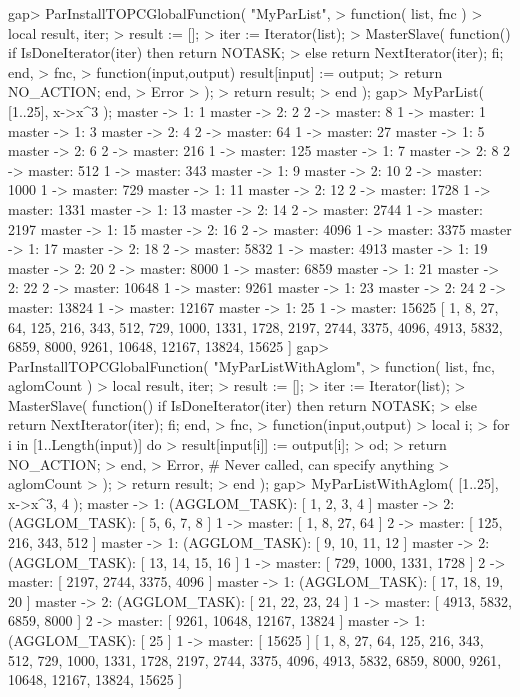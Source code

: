 \beginexample
gap> ParInstallTOPCGlobalFunction( "MyParList",
> function( list, fnc )
>   local result, iter;
>   result := [];
>   iter := Iterator(list);
>   MasterSlave( function() if IsDoneIterator(iter) then return NOTASK;
>                           else return NextIterator(iter); fi; end,
>                fnc,
>                function(input,output) result[input] := output;
>                                       return NO_ACTION; end,
>                Error
>              );
>   return result;
> end );
gap> MyParList( [1..25], x->x^3 );
master -> 1:  1
master -> 2:  2
2 -> master: 8
1 -> master: 1
master -> 1:  3
master -> 2:  4
2 -> master: 64
1 -> master: 27
master -> 1:  5
master -> 2:  6
2 -> master: 216
1 -> master: 125
master -> 1:  7
master -> 2:  8
2 -> master: 512
1 -> master: 343
master -> 1:  9
master -> 2:  10
2 -> master: 1000
1 -> master: 729
master -> 1:  11
master -> 2:  12
2 -> master: 1728
1 -> master: 1331
master -> 1:  13
master -> 2:  14
2 -> master: 2744
1 -> master: 2197
master -> 1:  15
master -> 2:  16
2 -> master: 4096
1 -> master: 3375
master -> 1:  17
master -> 2:  18
2 -> master: 5832
1 -> master: 4913
master -> 1:  19
master -> 2:  20
2 -> master: 8000
1 -> master: 6859
master -> 1:  21
master -> 2:  22
2 -> master: 10648
1 -> master: 9261
master -> 1:  23
master -> 2:  24
2 -> master: 13824
1 -> master: 12167
master -> 1:  25
1 -> master: 15625
[ 1, 8, 27, 64, 125, 216, 343, 512, 729, 1000, 1331, 1728, 2197, 2744, 3375, 
  4096, 4913, 5832, 6859, 8000, 9261, 10648, 12167, 13824, 15625 ]
gap> ParInstallTOPCGlobalFunction( "MyParListWithAglom",
> function( list, fnc, aglomCount )
>   local result, iter;
>   result := [];
>   iter := Iterator(list);
>   MasterSlave( function() if IsDoneIterator(iter) then return NOTASK;
>                           else return NextIterator(iter); fi; end,
>                fnc,
>                function(input,output)
>                  local i;
>                  for i in [1..Length(input)] do
>                    result[input[i]] := output[i];
>                  od;
>                  return NO_ACTION;
>                end,
>                Error,  # Never called, can specify anything
>                aglomCount
>              );
>   return result;
> end );
gap> MyParListWithAglom( [1..25], x->x^3, 4 );
master -> 1: (AGGLOM_TASK): [ 1, 2, 3, 4 ]
master -> 2: (AGGLOM_TASK): [ 5, 6, 7, 8 ]
1 -> master: [ 1, 8, 27, 64 ]
2 -> master: [ 125, 216, 343, 512 ]
master -> 1: (AGGLOM_TASK): [ 9, 10, 11, 12 ]
master -> 2: (AGGLOM_TASK): [ 13, 14, 15, 16 ]
1 -> master: [ 729, 1000, 1331, 1728 ]
2 -> master: [ 2197, 2744, 3375, 4096 ]
master -> 1: (AGGLOM_TASK): [ 17, 18, 19, 20 ]
master -> 2: (AGGLOM_TASK): [ 21, 22, 23, 24 ]
1 -> master: [ 4913, 5832, 6859, 8000 ]
2 -> master: [ 9261, 10648, 12167, 13824 ]
master -> 1: (AGGLOM_TASK): [ 25 ]
1 -> master: [ 15625 ]
[ 1, 8, 27, 64, 125, 216, 343, 512, 729, 1000, 1331, 1728, 2197, 2744, 3375, 
  4096, 4913, 5832, 6859, 8000, 9261, 10648, 12167, 13824, 15625 ]
\endexample

